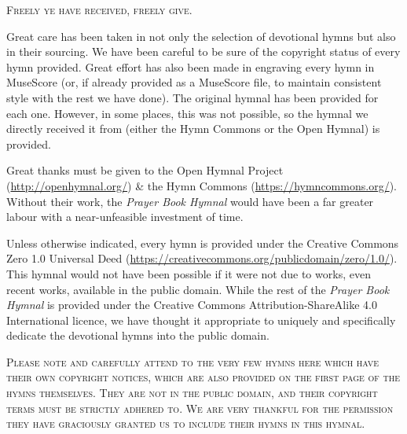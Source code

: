 {}
\fancyhead[RO,LE]{}
\fancyhead[RE,LO]{}

\begin{center}
	\textsc{Freely ye have received, freely give.}
\end{center}

\begin{rubric}
	Great care has been taken in not only the selection of devotional hymns but also in their sourcing. We have been careful to be sure of the copyright status of every hymn provided. Great effort has also been made in engraving every hymn in MuseScore (or, if already provided as a MuseScore file, to maintain consistent style with the rest we have done). The original hymnal has been provided for each one. However, in some places, this was not possible, so the hymnal we directly received it from (either the Hymn Commons or the Open Hymnal) is provided.
\end{rubric}

\begin{rubric}
	Great thanks must be given to the Open Hymnal Project (\url{http://openhymnal.org/}) \& the Hymn Commons (\url{https://hymncommons.org/}). Without their work, the \textit{Prayer Book Hymnal} would have been a far greater labour with a near-unfeasible investment of time.
\end{rubric}

\begin{rubric}
	Unless otherwise indicated, every hymn is provided under the Creative Commons Zero 1.0 Universal Deed (\url{https://creativecommons.org/publicdomain/zero/1.0/}). This hymnal would not have been possible if it were not due to works, even recent works, available in the public domain. While the rest of the \textit{Prayer Book Hymnal} is provided under the Creative Commons Attribution-ShareAlike 4.0 International licence, we have thought it appropriate to uniquely and specifically dedicate the devotional hymns into the public domain.
	
	\begin{center}
		{\textsc{\normalsize%
		Please note and carefully attend to the very few hymns here which have their own copyright notices, which are also provided on the first page of the hymns themselves. They are not in the public domain, and their copyright terms must be strictly adhered to. We are very thankful for the permission they have graciously granted us to include their hymns in this hymnal.}}
	\end{center}
	
\end{rubric}

